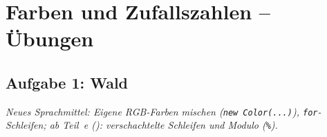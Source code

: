 \clearpage

\rehead[]{\textcolor{lightblue}{AvHG, Inf, My}}
\lohead[]{\textcolor{lightblue}{AvHG, Inf, My}}

\section{Farben und Zufallszahlen -- Übungen}

\subsection{Aufgabe 1: Wald \tagPflicht}
\noindent \emph{Neues Sprachmittel: Eigene RGB-Farben mischen (\texttt{new Color(...)}), \texttt{for}-Schleifen; ab Teil~e (\tagLK): verschachtelte Schleifen und Modulo (\texttt{\%}).}


